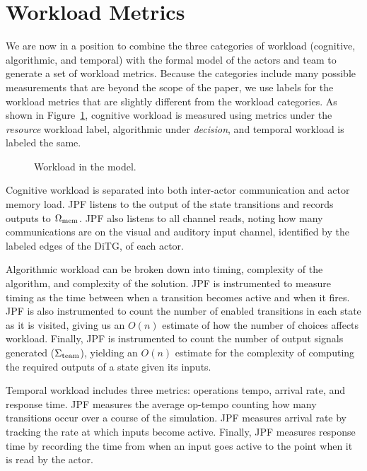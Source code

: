 \section{Workload Metrics}
We are now in a position to combine the three categories of workload (cognitive, algorithmic, and temporal) with the formal model of the actors and team to generate a set of workload metrics.  Because the categories include many possible measurements that are beyond the scope of the paper, we use labels for the workload metrics that are slightly different from the workload categories.  As shown in Figure~\ref{fig:WorkloadMetrics}, cognitive workload is measured using metrics under the {\em resource} workload label, algorithmic under {\em decision}, and temporal workload is labeled the same. 


\begin{figure}[h]
\center
\setlength{\abovecaptionskip}{1mm}
\setlength{\belowcaptionskip}{1mm}
\setlength{\textfloatsep}{1mm}
\setlength{\floatsep}{1mm}
\caption{Workload in the model.}
\label{fig:WorkloadMetrics}
\end{figure}

Cognitive workload is separated into both inter-actor communication and actor memory load. JPF listens to the output of the state transitions and records outputs to $\Omega_{\rm mem}$.  JPF also listens to all channel reads, noting how many communications are on the visual and auditory input channel, identified by the labeled edges of the DiTG, of each actor. 

Algorithmic workload can be broken down into timing, complexity of the algorithm, and complexity of the solution. JPF is instrumented to measure timing as the time between when a transition becomes active and when it fires.  JPF is also instrumented to count the number of enabled transitions in each state as it is visited, giving us an $O(n)$ estimate of how the number of choices affects workload.   Finally, JPF is instrumented to count the number of output signals generated ($\Sigma_{\rm team}$), yielding an $O(n)$ estimate for the complexity of computing the required outputs of a state given its inputs.

Temporal workload includes three metrics: operations tempo, arrival rate, and response time.  JPF measures the average op-tempo counting how many transitions occur over a course of the simulation. JPF measures arrival rate by tracking the rate at which inputs become active. Finally, JPF measures response time by recording the time from when an input goes active to the point when it is read by the actor.

